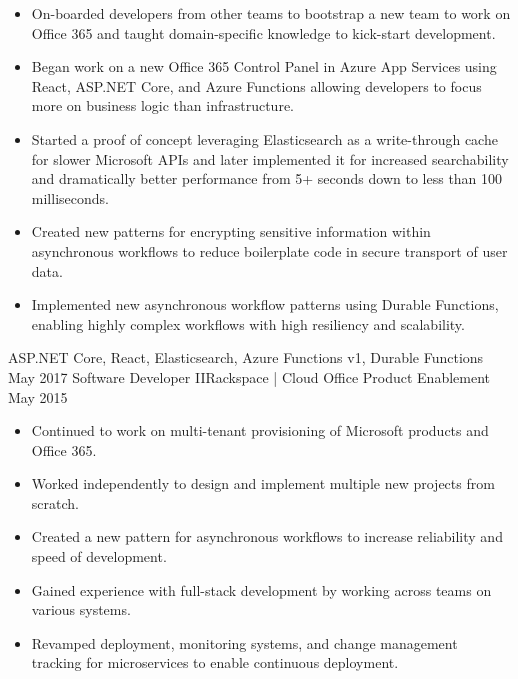 \begin{experiences}
{                      \begin{itemize}
                        \item On-boarded developers from other teams to bootstrap a new team to work on Office 365 and taught domain-specific knowledge to kick-start development.
                        \item Began work on a new Office 365 Control Panel in Azure App Services using React, ASP.NET Core, and Azure Functions allowing developers to focus more on business logic than infrastructure.
                        \item Started a proof of concept leveraging Elasticsearch as a write-through cache for slower Microsoft APIs and later implemented it for increased searchability and dramatically better performance from 5+ seconds down to less than 100 milliseconds.
                        \item Created new patterns for encrypting sensitive information within asynchronous workflows to reduce boilerplate code in secure transport of user data.
                        \item Implemented new asynchronous workflow patterns using Durable Functions, enabling highly complex workflows with high resiliency and scalability.
                      \end{itemize}
                    }
                    {ASP.NET Core, React, Elasticsearch, Azure Functions v1, Durable Functions}
  \emptySeparator
  \experience
    {May 2017}     {Software Developer II}{Rackspace | Cloud Office Product Enablement}
    {May 2015}     {
                      \begin{itemize}
                        \item Continued to work on multi-tenant provisioning of Microsoft products and Office 365.
                        \item Worked independently to design and implement multiple new projects from scratch.
                        \item Created a new pattern for asynchronous workflows to increase reliability and speed of development.
                        \item Gained experience with full-stack development by working across teams on various systems.
                        \item Revamped deployment, monitoring systems, and change management tracking for microservices to enable continuous deployment.
                      \end{itemize}
}
\end{experiences}
